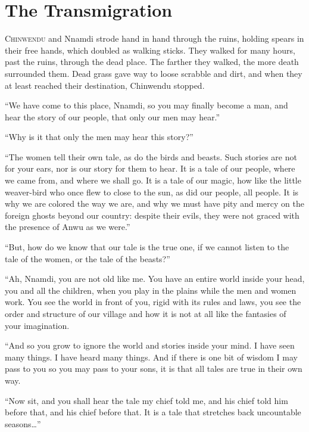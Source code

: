 \chapter{The Transmigration}

\lettrine{C}{hinwendu} and Nnamdi strode hand in hand through the ruins, holding spears in their free hands, which doubled as walking sticks. They walked for many hours, past the ruins, through the dead place. The farther they walked, the more death surrounded them. Dead grass gave way to loose scrabble and dirt, and when they at least reached their destination, Chinwendu stopped.

“We have come to this place, Nnamdi, so you may finally become a man, and hear the story of our people, that only our men may hear.”

“Why is it that only the men may hear this story?”

“The women tell their own tale, as do the birds and beasts. Such stories are not for your ears, nor is our story for them to hear. It is a tale of our people, where we came from, and where we shall go. It is a tale of our magic, how like the little weaver-bird who once flew to close to the sun, as did our people, all people. It is why we are colored the way we are, and why we must have pity and mercy on the foreign ghosts beyond our country: despite their evils, they were not graced with the presence of Anwu as we were.”

“But, how do we know that our tale is the true one, if we cannot listen to the tale of the women, or the tale of the beasts?”

“Ah, Nnamdi, you are not old like me. You have an entire world inside your head, you and all the children, when you play in the plains while the men and women work. You see the world in front of you, rigid with its rules and laws, you see the order and structure of our village and how it is not at all like the fantasies of your imagination.

“And so you grow to ignore the world and stories inside your mind. I have seen many things. I have heard many things. And if there is one bit of wisdom I may pass to you so you may pass to your sons, it is that all tales are true in their own way.

“Now sit, and you shall hear the tale my chief told me, and his chief told him before that, and his chief before that. It is a tale that stretches back uncountable seasons…”

